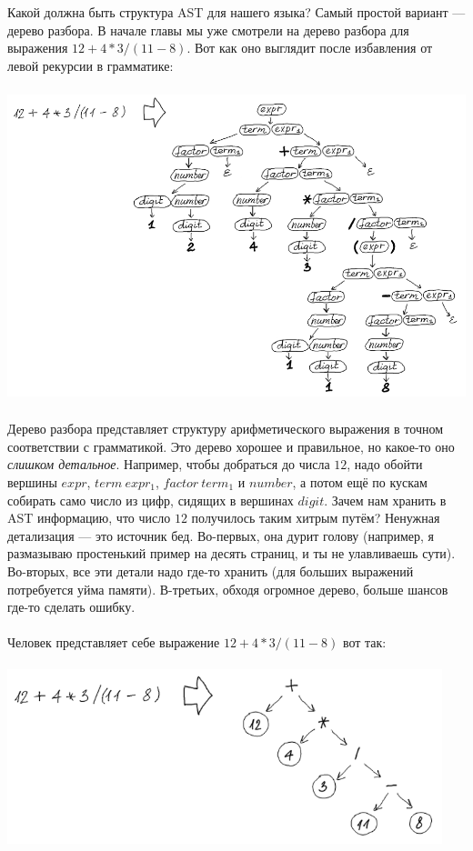 \documentclass[11pt]{book}
\begin{document}
Какой должна быть структура AST для нашего языка?
Самый простой вариант --- дерево разбора. В начале главы мы уже смотрели на дерево разбора
для выражения $12 + 4 * 3 / (11 - 8)$. Вот как оно выглядит
после избавления от левой рекурсии в грамматике:
\\ \\
\includegraphics[height=3.5in]{pic/19.png}
\\ \\
Дерево разбора представляет структуру арифметического выражения в точном соответствии с грамматикой.
Это дерево хорошее и правильное, но какое-то оно \emph{слишком детальное}.
Например, чтобы добраться до числа $12$, надо обойти вершины $expr$, $term \ expr_1$, $factor \ term_1$ и $number$,
а потом ещё по кускам собирать само число из цифр, сидящих в вершинах $digit$.
Зачем нам хранить в AST информацию, что число $12$ получилось таким хитрым путём?
Ненужная детализация --- это источник бед. Во-первых, она дурит голову (например,
я размазываю простенький пример на десять страниц, и ты не улавливаешь сути). Во-вторых,
все эти детали надо где-то хранить (для больших выражений потребуется уйма памяти).
В-третьих, обходя огромное дерево, больше шансов где-то сделать ошибку.
\\ \\
Человек представляет себе выражение $12 + 4 * 3 / (11 - 8)$ вот так:
\\ \\
\includegraphics[height=2in]{pic/20.png}
\end{document}
